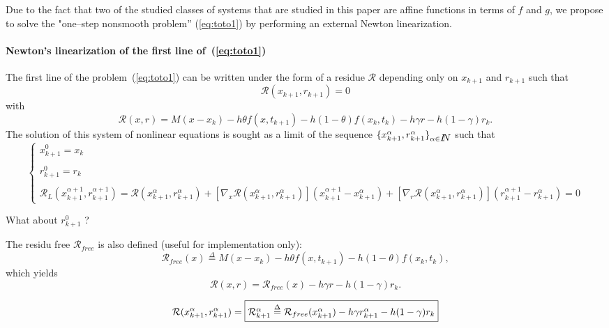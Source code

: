 
Due to the fact that  two of the  studied classes of systems that are studied in this paper are affine functions in terms of $f$ and $g$, we propose to solve the "one--step nonsmooth problem'' (\ref{eq:toto1}) by performing an external Newton linearization.

 \paragraph{Newton's linearization of the first line of~(\ref{eq:toto1})} The first line of the  problem~(\ref{eq:toto1}) can be written under the form of a residue $\mathcal R$ depending only on $x_{k+1}$ and $r_{k+1}$ such that 
\begin{equation}
  \label{eq:NL3}
  \mathcal R (x_{k+1},r _{k+1}) =0
\end{equation}
with 
\begin{equation}
\mathcal R(x,r) = M(x - x_{k}) -h\theta f( x , t_{k+1}) - h(1-\theta)f(x_k,t_k) - h\gamma r
- h(1-\gamma)r_k.
\end{equation}
The solution of this system of nonlinear equations is sought as a limit of the sequence $\{ x^{\alpha}_{k+1},r^{\alpha}_{k+1} \}_{\alpha \in \mbox{\rm $I\!\!N$}}$ such that
 \begin{equation}
   \label{eq:NL7}
   \begin{cases}
     x^{0}_{k+1} = x_k \\ \\
     r^{0}_{k+1} = r_k \\ \\
     \mathcal R_L( x^{\alpha+1}_{k+1},r^{\alpha+1}_{k+1}) = \mathcal
     R(x^{\alpha}_{k+1},r^{\alpha}_{k+1})  + \left[ \nabla_{x} \mathcal
     R(x^{\alpha}_{k+1},r^{\alpha}_{k+1})\right] (x^{\alpha+1}_{k+1}-x^{\alpha}_{k+1} ) +
     \left[ \nabla_{r} \mathcal R(x^{\alpha}_{k+1},r^{\alpha}_{k+1})\right] (r^{\alpha+1}_{k+1} - r^{\alpha}_{k+1} ) =0
 \end{cases}
\end{equation}
\begin{ndrva}
  What about $r^0_{k+1}$ ?
\end{ndrva}

The residu free $\mathcal R _{free}$ is also defined (useful for implementation only):
\[\mathcal R _{free}(x) \stackrel{\Delta}{=}  M(x - x_{k}) -h\theta f( x , t_{k+1}) - h(1-\theta)f(x_k,t_k),\]
which yields
\[\mathcal R (x,r) = \mathcal R _{free}(x)   - h\gamma r - h(1-\gamma)r_k.\]

\begin{equation}
  \mathcal R (x^{\alpha}_{k+1},r^{\alpha}_{k+1}) = \fbox{$\mathcal R^{\alpha}_{k+1} \stackrel{\Delta}{=}  \mathcal R
_{free}(x^{\alpha}_{k+1})  - h\gamma r^{\alpha}_{k+1} - h(1-\gamma)r_k$}\label{eq:rfree-1}
\end{equation}


